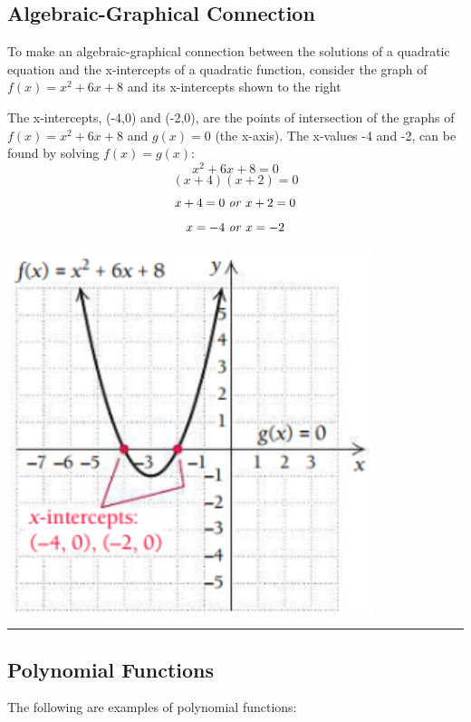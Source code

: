 \documentclass{report}
\begin{document}
\subsection{Algebraic-Graphical Connection}
\bigbreak \noindent
\begin{minipage}{0.5\textwidth}
To make an algebraic-graphical connection  between the solutions of a quadratic equation and the x-intercepts of a quadratic function, consider the graph of $f(x) = x^2+6x+8$ and its x-intercepts shown to the right

The x-intercepts, (-4,0) and (-2,0), are the points of intersection of the graphs of $f(x) = x^2 +6x+8$ and $g(x) = 0$ (the x-axis). The x-values -4 and -2, can be found by solving $f(x) = g(x)$:
$$ x^2+6x+8=0$$
$$(x+4)(x+2) = 0$$
$$x+4 = 0 \text{ \textit{or} } x + 2 = 0$$
$$ x = -4 \text{ \textit{or} } x = -2$$
\end{minipage}
\hfill
\begin{minipage}{0.4\textwidth}
      \centering
  \includegraphics[width=0.8\textwidth]{ graph.png }
\end{minipage}
\bigbreak \noindent \bigbreak \noindent
\hrule
\subsection{Polynomial Functions}
\pagebreak
\centerline{The following are examples of polynomial functions:}
\vspace{3mm}
\end{document}
